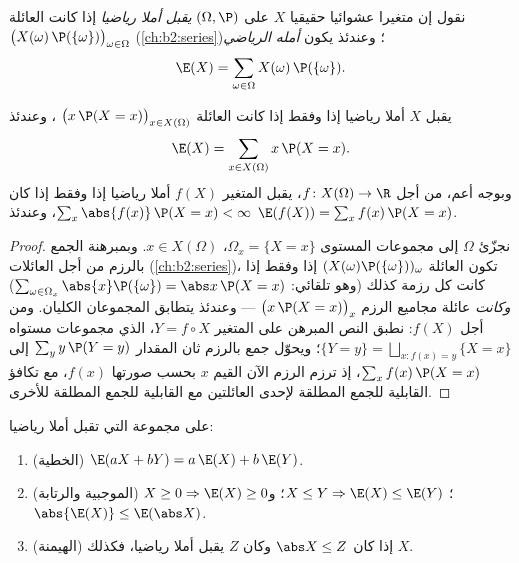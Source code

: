 \begin{definition}\label{def:b2:randomvar:expectation}
نقول إن متغيرا عشوائيا حقيقيا $X$ على $(\Omega, \P)$ \emph{يقبل أملا
رياضيا} إذا كانت العائلة $\bigl(X(\omega)\,\P(\{\omega\})\bigr)_{\omega \in \Omega}$  (\cref{ch:b2:series})؛ وعندئذ يكون
\emph{أمله الرياضي}
\[
\E(X) = \sum_{\omega \in \Omega} X(\omega)\,\P(\{\omega\}) .
\]
\end{definition}

\begin{theorem}\label{thm:b2:randomvar:transfer}
يقبل $X$ أملا رياضيا إذا وفقط إذا كانت العائلة $\bigl(x\,\P(X =
x)\bigr)_{x \in X(\Omega)}$ ،
وعندئذ
\[
\E(X) = \sum_{x \in X(\Omega)} x\,\P(X = x) .
\]
وبوجه أعم، من أجل $f \colon X(\Omega) \to \R$، يقبل المتغير $f(X)$ أملا رياضيا إذا وفقط
إذا كان $\sum_x \abs{f(x)}\,\P(X = x) <
\infty$، وعندئذ $\E(f(X)) = \sum_x f(x)\,\P(X = x)$.
\end{theorem}

\begin{proof}
نجزّئ $\Omega$ إلى مجموعات المستوى $\Omega_x = \{X = x\}$، $x
\in X(\Omega)$. وبمبرهنة الجمع
بالرزم من أجل العائلات  (\cref{ch:b2:series})، تكون العائلة $(X(\omega)\P(\{\omega\}))_\omega$
 إذا وفقط إذا كانت كل رزمة كذلك (وهو تلقائي: $\sum_{\omega \in \Omega_x}\abs{x}\P(\{\omega\}) =
\abs x\,\P(X = x)$)
\emph{وكانت} عائلة مجاميع الرزم $\bigl(x\,\P(X = x)\bigr)_x$  --- وعندئذ يتطابق
المجموعان الكليان. ومن أجل $f(X)$: نطبق النص المبرهن على المتغير
$Y =
f \circ X$، الذي مجموعات مستواه $\{Y = y\} =
\bigsqcup_{x : f(x) = y}\{X = x\}$؛ ويحوّل جمع بالرزم ثان المقدار
$\sum_y y\,\P(Y = y)$ إلى $\sum_x
f(x)\,\P(X = x)$، إذ ترزم الرزم الآن القيم $x$ بحسب صورتها $f(x)$،
مع تكافؤ القابلية للجمع المطلقة لإحدى العائلتين مع القابلية للجمع
المطلقة للأخرى.
\end{proof}

\begin{theorem}\label{thm:b2:randomvar:linearity}
على مجموعة  التي تقبل أملا رياضيا:
\begin{enumerate}
\item (الخطية) $\E(aX + bY) = a\,\E(X) + b\,\E(Y)$.
\item (الموجبية والرتابة) $X \geq 0 \Rightarrow \E(X)
\geq 0$؛ $X \leq Y \Rightarrow \E(X) \leq \E(Y)$؛ و$\abs{\E(X)} \leq \E(\abs X)$.
\item (الهيمنة) إذا كان $\abs X \leq Z$ وكان $Z$ يقبل أملا رياضيا، فكذلك
$X$.
\end{enumerate}
\end{theorem}

